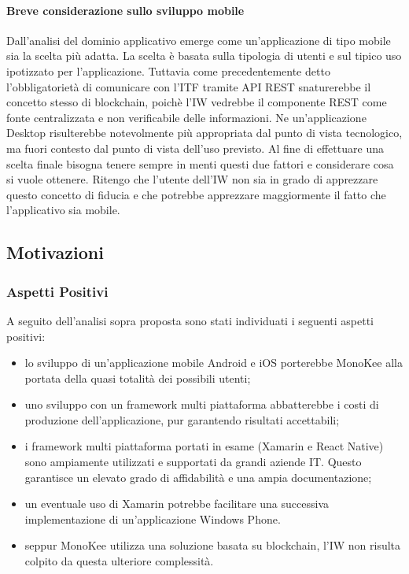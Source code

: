 \paragraph{Breve considerazione sullo sviluppo mobile}
Dall’analisi del dominio applicativo emerge come un’applicazione di tipo mobile sia la scelta più adatta. La scelta è basata sulla tipologia di utenti e sul tipico uso ipotizzato per l’applicazione. Tuttavia come precedentemente detto l’obbligatorietà di comunicare con l’ITF tramite API REST snaturerebbe il concetto stesso di blockchain, poichè l’IW vedrebbe il componente REST come fonte centralizzata e non verificabile delle informazioni. Ne un’applicazione Desktop risulterebbe notevolmente più appropriata dal punto di vista tecnologico, ma fuori contesto dal punto di vista dell’uso previsto.
Al fine di effettuare una scelta finale bisogna tenere sempre in menti questi due fattori e considerare cosa si vuole ottenere. Ritengo che l’utente dell’IW non sia in grado di apprezzare questo concetto di fiducia e che potrebbe apprezzare maggiormente il fatto che l’applicativo sia mobile.  
\subsection{Motivazioni}
\subsubsection{Aspetti Positivi}
A seguito dell’analisi sopra proposta sono stati individuati i seguenti aspetti positivi:
\begin{itemize} 
    \item lo sviluppo di un’applicazione mobile Android e iOS porterebbe MonoKee alla portata della quasi totalità dei possibili utenti;
    \item uno sviluppo con un framework multi piattaforma abbatterebbe i costi di produzione dell’applicazione, pur garantendo risultati accettabili;
    \item i framework multi piattaforma portati in esame (Xamarin e React Native) sono ampiamente utilizzati e supportati da grandi aziende IT. Questo garantisce un elevato grado di affidabilità e una ampia documentazione;
    \item un eventuale uso di Xamarin potrebbe facilitare una successiva implementazione di un’applicazione Windows Phone.
    \item seppur MonoKee utilizza una soluzione basata su blockchain, l’IW non risulta colpito da questa ulteriore complessità.
\end{itemize}
